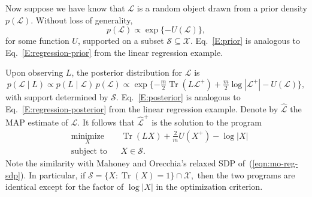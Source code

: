 \documentclass[12pt]{article}
\DeclareMathOperator*{\Tr}{Tr}
\theoremstyle{plain}
\begin{document}
Now suppose we have know that $\mathcal{L}$ is a random object drawn from a 
prior density $p(\mathcal{L})$.
Without loss of generality,
\begin{equation}
\label{E:prior}
  p(\mathcal{L}) \propto \exp\{ -U(\mathcal{L}) \},
\end{equation}
for some function $U$, supported on a subset
$\mathcal{S} \subseteq \mathcal{X}$.
Eq.~\eqref{E:prior} is analogous to Eq.~\eqref{E:regression-prior} from the 
linear regression example.

Upon observing $L$, the posterior distribution for $\mathcal{L}$ is
\begin{equation}\label{E:posterior}
  p(\mathcal{L} \mid L)
    \propto p(L \mid \mathcal{L}) \, p (\mathcal{L})
    \propto \exp\{ -\tfrac{m}{2} \Tr(L \mathcal{L}^+)
                   + \tfrac{m}{2} \log |\mathcal{L}^+|
                   - U(\mathcal{L}) \},
\end{equation}
with support determined by $\mathcal{S}$.  
Eq.~\eqref{E:posterior} is analogous to Eq.~\eqref{E:regression-posterior} 
from the linear regression example.
Denote by $\mathcal{\hat L}$ the MAP estimate of $\mathcal{L}$.
It follows that $\mathcal{\hat L}^+$ is the solution to the program
\[
\begin{aligned}
  & \underset{X}{\text{minimize}}
  & & \Tr(L X) + \tfrac{2}{m} U(X^+) - \log |X| \\
  & \text{subject to}
  & & X \in \mathcal{S}.
\end{aligned}
\]
Note the similarity with Mahoney and Orecchia's relaxed SDP 
of~(\ref{eqn:mo-reg-sdp}).
In particular, if
\(
  \mathcal{S} = \{ X : \Tr(X) = 1 \} \cap \mathcal{X},
\)
then the two programs are identical except for the factor of
$\log |X|$ in the optimization criterion.

\end{document}
